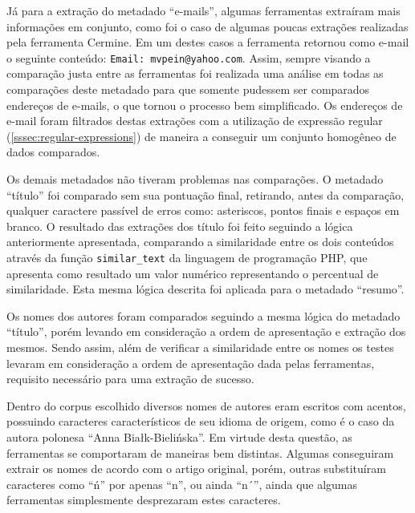 Já para a extração do metadado ``e-mails'', algumas ferramentas extraíram mais informações em conjunto, como foi o caso de algumas poucas extrações realizadas pela ferramenta Cermine. Em um destes casos a ferramenta retornou como e-mail o seguinte conteúdo: \texttt{Email: mvpein@yahoo.com}. Assim, sempre visando a comparação justa entre as ferramentas foi realizada uma análise em todas as comparações deste metadado para que somente pudessem ser comparados endereços de e-mails, o que tornou o processo bem simplificado. Os endereços de e-mail foram filtrados destas extrações com a utilização de expressão regular (\autoref{sssec:regular-expressions}) de maneira a conseguir um conjunto homogêneo de dados comparados.

Os demais metadados não tiveram problemas nas comparações. O metadado ``título'' foi comparado sem sua pontuação final, retirando, antes da comparação, qualquer caractere passível de erros como: asteriscos, pontos finais e espaços em branco. O resultado das extrações dos título foi feito seguindo a lógica anteriormente apresentada, comparando a similaridade entre os dois conteúdos através da função \texttt{similar\_text} da linguagem de programação PHP, que apresenta como resultado um valor numérico representando o percentual de similaridade. Esta mesma lógica descrita foi aplicada para o metadado ``resumo''.

Os nomes dos autores foram comparados seguindo a mesma lógica do metadado ``título'', porém levando em consideração a ordem de apresentação e extração dos mesmos. Sendo assim, além de verificar a similaridade entre os nomes os testes levaram em consideração a ordem de apresentação dada pelas ferramentas, requisito necessário para uma extração de sucesso.


Dentro do corpus escolhido diversos nomes de autores eram escritos com acentos, possuindo caracteres característicos de seu idioma de origem, como é o caso da autora polonesa ``Anna Białk-Bielińska''. Em virtude desta questão, as ferramentas se comportaram de maneiras bem distintas. Algumas conseguiram extrair os nomes de acordo com o artigo original, porém, outras substituíram caracteres como ``ń'' por apenas ``n'', ou ainda ``n´'', ainda que algumas ferramentas simplesmente desprezaram estes caracteres.

